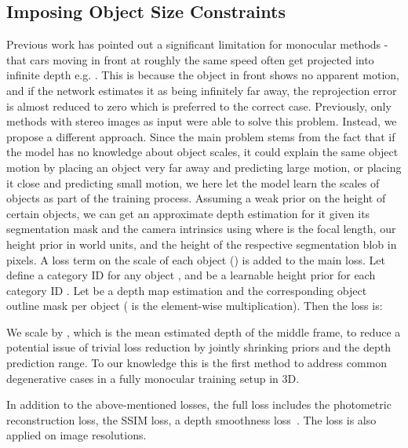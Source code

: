 \documentclass[10pt,twocolumn,letterpaper]{article}
\begin{document}
\subsection{Imposing Object Size Constraints}
Previous work has pointed out a significant limitation for monocular methods \cite{godard2018digging} \cite{yang2018every} \cite{wang2018learning} - that cars moving in front at roughly the same speed often get projected into infinite depth e.g. \cite{godard2018digging,yang2018every}. This is because the object in front shows no apparent motion, and if the network estimates it as being infinitely far away, the reprojection error is almost reduced to zero which is preferred to the correct case.
Previously, only methods with stereo images as input were able to solve this problem. Instead, we propose a different approach. Since the main problem stems from the fact that if the model has no knowledge about object scales, it could explain the same object motion by placing an object very far away and predicting large motion, or placing it close and predicting small motion, we here let the model learn the scales of objects as part of the training process. Assuming a weak prior on the height of certain objects, we can get an approximate depth estimation for it given its segmentation mask and the camera intrinsics using  where  is the focal length,  our height prior in world units, and  the height of the respective segmentation blob in pixels. A loss term on the scale of each object  () is added to the main loss. Let  define a category ID for any object , and  be a learnable height prior for each category ID . Let  be a depth map estimation and  the corresponding object outline mask per object  ( is the element-wise multiplication). Then the loss is:



\noindent We scale by , which is the mean estimated depth of the middle frame, to reduce a potential issue of trivial loss reduction by jointly shrinking priors and the depth prediction range.
To our knowledge this is the first method to address common degenerative cases in a fully monocular training setup in 3D.

In addition to the above-mentioned losses, the full loss includes the photometric reconstruction loss, the SSIM loss, a depth smoothness loss~\cite{zhou2017unsupervised,wang2018learning}. The loss is also applied on  image resolutions.
\end{document}

